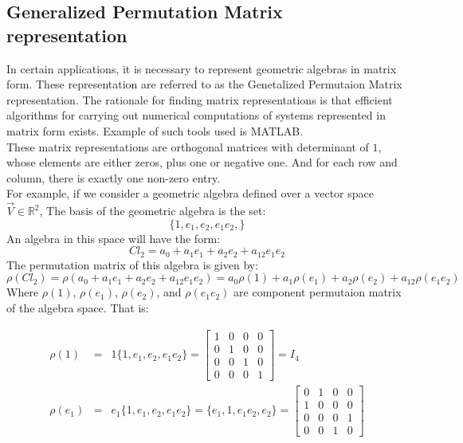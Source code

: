 \documentclass[12pt,onecolumn,letterpaper]{article} %
\begin{document}
\subsection{Generalized Permutation Matrix representation}
In certain applications, it is necessary to represent geometric algebras in matrix form. These representation are referred to as the Genetalized Permutaion Matrix representation. The rationale for finding matrix representations is that efficient algorithms for carrying out numerical computations of systems represented in matrix form exists. Example of such tools used is MATLAB.\\
\indent These matrix representations are orthogonal matrices with determinant of $1$,  whose elements are either zeros, plus one or negative one. And for each row and column, there is exactly one non-zero entry.\\
For example, if we consider a geometric algebra defined over a vector space $\vec{V}\in\mathbb{R}^{2}$, The basis of the geometric algebra is the set:
$$\{1,e_{1},e_{2},e_{1}e_{2},\}$$
An algebra in this space will have the form:
$$Cl_2=a_0+a_1e_{1}+a_2e_{2}+a_{12}e_{1}e_{2}$$
The permutation matrix of this algebra is given by:
$$\rho(Cl_2)=\rho(a_0+a_1e_{1}+a_2e_{2}+a_{12}e_{1}e_{2})=a_0\rho(1)+a_1\rho(e_{1})+a_2\rho(e_{2})+a_{12}\rho(e_{1}e_{2})$$
Where $\rho(1)$, $\rho(e_1)$, $\rho(e_2)$,  and $\rho(e_1e_2)$ are component permutaion matrix of the algebra space. That is:


 \begin{eqnarray*}
    \rho(1)&=&1\{1,e_{1},e_{2},e_{1}e_{2}\}=\left [
\begin{array}{llll}
1 & 0 & 0 & 0 \\
0 & 1 & 0 & 0 \\
0 & 0 & 1 & 0\\
 0 & 0 & 0 & 1
\end{array} \right ]=I_4\\
\rho(e_1)&=&e_1\{1,e_{1},e_{2},e_{1}e_{2}\}=\{e_1,1,e_1e_{2},e_{2}\}=\left[
\begin{array}{llll}
0 & 1 & 0 & 0 \\
1 & 0 & 0 & 0 \\
0 & 0 & 0 & 1\\
 0 & 0 & 1 & 0
\end{array} \right ]
\end{eqnarray*}
\end{document}
